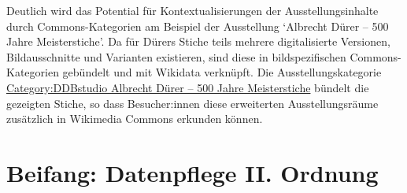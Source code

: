 \documentclass[a4paper,
fontsize=11pt,
oneside,
numbers=noperiodatend,
parskip=half-,
bibliography=totoc,
final
]{scrartcl}
\begin{document}
Deutlich wird das Potential für Kontextualisierungen der
Ausstellungsinhalte durch Commons-Kategorien am Beispiel der Ausstellung
\enquote*{Albrecht Dürer -- 500 Jahre Meisterstiche}. Da für Dürers
Stiche teils mehrere digitalisierte Versionen, Bildausschnitte und
Varianten existieren, sind diese in bildspezifischen Commons-Kategorien
gebündelt und mit Wikidata verknüpft. Die Ausstellungskategorie
\href{https://commons.wikimedia.org/wiki/Category:DDBstudio_Albrecht_D\%C3\%BCrer_\%E2\%80\%93_500_Jahre_Meisterstiche}{Category:DDBstudio
Albrecht Dürer -- 500 Jahre Meisterstiche} bündelt die gezeigten Stiche,
so dass Besucher:innen diese erweiterten Ausstellungsräume zusätzlich in
Wikimedia Commons erkunden können.

\hypertarget{beifang-datenpflege-ii.-ordnung}{%
\section{Beifang: Datenpflege II.
Ordnung}\label{beifang-datenpflege-ii.-ordnung}}
\end{document}
